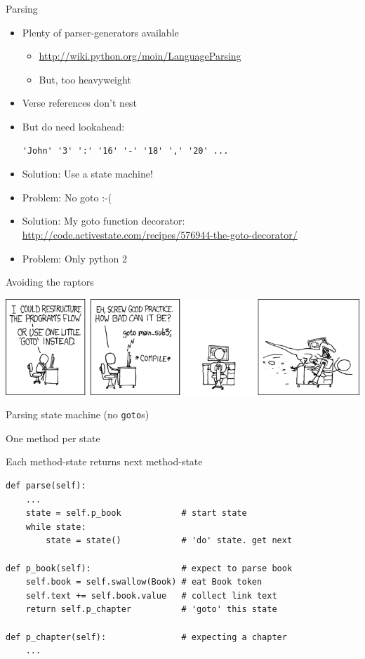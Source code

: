 \documentclass{beamer}
\begin{document}
\begin{frame}[fragile]{Parsing}

\begin{itemize}
\item Plenty of parser-generators available
\begin{itemize}
\item \url{http://wiki.python.org/moin/LanguageParsing}

\item But, too heavyweight
\end{itemize}

\item Verse references don't nest

\item But do need lookahead:
\begin{verbatim}
'John' '3' ':' '16' '-' '18' ',' '20' ...
\end{verbatim}

\item Solution: Use a state machine!

\pause
\item Problem: No goto :-(

\pause
\item Solution: My goto function decorator:\\
\url{http://code.activestate.com/recipes/576944-the-goto-decorator/}

\pause
\item Problem: Only python 2
\end{itemize}
\end{frame}

\begin{frame}{Avoiding the raptors}
    \centerline{\includegraphics[keepaspectratio=true, width=\paperwidth]{goto.png}}
\end{frame}


\begin{frame}[fragile]{Parsing state machine (no \texttt{goto}s)}

One method per state

Each method-state returns next method-state

\begin{verbatim}
def parse(self):
    ...
    state = self.p_book            # start state
    while state:
        state = state()            # 'do' state. get next
		
def p_book(self):                  # expect to parse book
    self.book = self.swallow(Book) # eat Book token
    self.text += self.book.value   # collect link text
    return self.p_chapter          # 'goto' this state
	
def p_chapter(self):               # expecting a chapter
    ...
\end{verbatim}
\end{frame}
\end{document}
